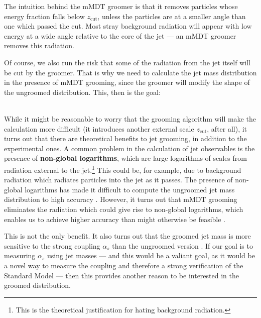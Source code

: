 \documentclass[../thesis.tex]{subfiles}
\providecommand{\zcut}{z_{\mathrm{cut}}}
\begin{document}
	The intuition behind the mMDT groomer is that it removes particles whose energy fraction falls below $\zcut$, unless the particles are at a smaller angle than one which passed the cut. Most stray background radiation will appear with low energy at a wide angle relative to the core of the jet --- an mMDT groomer removes this radiation.

	Of course, we also run the risk that some of the radiation from the jet itself will be cut by the groomer. That is why we need to calculate the jet mass distribution in the presence of mMDT grooming, since the groomer will modify the shape of the ungroomed distribution. This, then is the goal:\\

	\noindent{}
	
	\,\\

	While it might be reasonable to worry that the grooming algorithm will make the calculation more difficult (it introduces another external scale $\zcut$, after all), it turns out that there are theoretical benefits to jet grooming, in addition to the experimental ones. A common problem in the calculation of jet observables is the presence of \textbf{non-global logarithms}, which are large logarithms of scales from radiation external to the jet.\footnote{This is the theoretical justification for hating background radiation.} This could be, for example, due to background radiation which radiates particles into the jet as it passes. The presence of non-global logarithms has made it difficult to compute the ungroomed jet mass distribution to high accuracy \cite{dasgupta_towards_2013}. However, it turns out that mMDT grooming eliminates the radiation which could give rise to non-global logarithms, which enables us to achieve higher accuracy than might otherwise be feasible \cite{dasgupta_towards_2013, frye_factorization_2016}.

	This is not the only benefit. It also turns out that the groomed jet mass is more sensitive to the strong coupling $\alpha_s$ than the ungroomed version \cite{larkoski_improving_2020}. If our goal is to measuring $\alpha_s$ using jet masses --- and this would be a valiant goal, as it would be a novel way to measure the coupling and therefore a strong verification of the Standard Model --- then this provides another reason to be interested in the groomed distribution.
\end{document}
